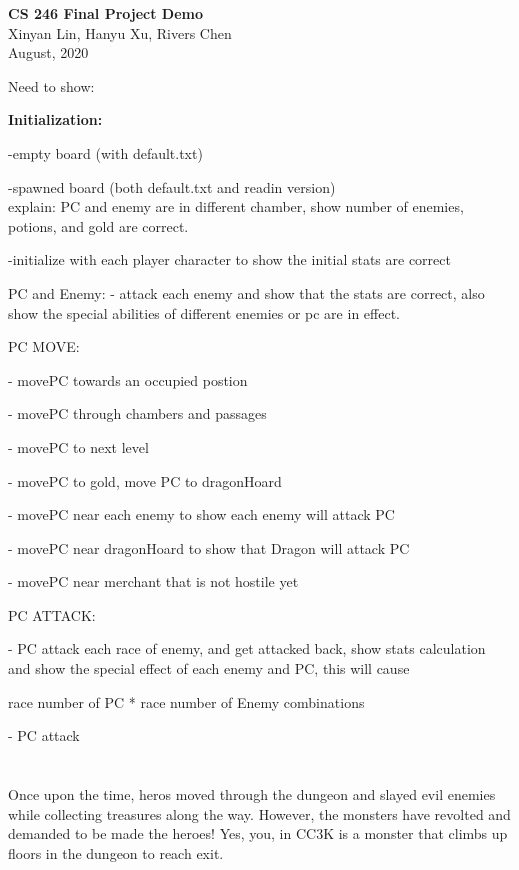 \documentclass[11pt]{article}
\theoremstyle{plain}
\begin{document}
\begin{center}
{\LARGE \textbf{CS 246 Final Project Demo}}\\
\vspace{0.15 in}
Xinyan Lin, Hanyu Xu, Rivers Chen\\ 
\vspace{0.07 in} August, 2020
\end{center}

\vspace{0.2 in}


Need to show:

\textbf{Initialization:}

-empty board (with default.txt)

-spawned board (both default.txt and readin version)\\
explain: PC and enemy are in different chamber, show number of enemies,
potions, and gold are correct.

-initialize with each player character to show the initial stats are correct





PC and Enemy:
- attack each enemy and show that the stats are correct, also show the 
special abilities of different enemies or pc are in effect.

PC MOVE:

- movePC towards an occupied postion

- movePC through chambers and passages

- movePC to next level

- movePC to gold, move PC to dragonHoard

- movePC near each enemy to show each enemy will attack PC

- movePC near dragonHoard to show that Dragon will attack PC

- movePC near merchant that is not hostile yet


PC ATTACK:

- PC attack each race of enemy, and get attacked back, show stats calculation
and show the special effect of each enemy and PC, this will cause 

race number of PC * race number of Enemy combinations

- PC attack \\\\\\


Once upon the time, heros moved through the dungeon and slayed evil enemies 
while collecting treasures along the way. However, the monsters have revolted
and demanded to be made the heroes!
Yes, you, in CC3K is a monster that climbs up floors in the dungeon to
reach exit.
\end{document}
